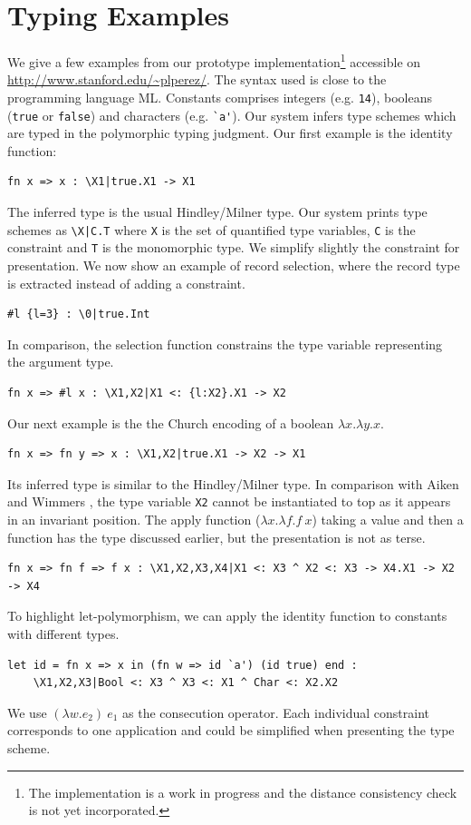 \documentclass{report}
\begin{document}
  \appendix
  \chapter{Typing Examples}
  We give a few examples from our prototype implementation\footnote{
    The implementation is a work in progress and the distance consistency check
    is not yet incorporated.}
  accessible on \url{http://www.stanford.edu/~plperez/}.
  The syntax used is close to the programming language ML. Constants comprises
  integers (e.g. \verb+14+), booleans (\verb+true+ or \verb+false+) and characters
  (e.g. \verb+`a'+). Our system infers type schemes which are typed
  in the polymorphic typing judgment.
  Our first example is the identity function:
  \begin{verbatim}fn x => x : \X1|true.X1 -> X1\end{verbatim}
  The inferred type is the usual Hindley/Milner type. Our system
  prints type schemes as \verb+\X|C.T+ where \verb+X+ is the set of quantified
  type variables, \verb+C+ is the constraint and \verb+T+ is the monomorphic
  type. We simplify slightly the constraint for presentation.
  We now show an example of record selection, where the record type
  is extracted instead of adding a constraint.
  \begin{verbatim}#l {l=3} : \0|true.Int\end{verbatim}
  In comparison, the selection function constrains the type variable
  representing the argument type.
  \begin{verbatim}fn x => #l x : \X1,X2|X1 <: {l:X2}.X1 -> X2\end{verbatim}
  Our next example is the the Church encoding of a boolean
  $\lambda x.\lambda y.x$.
  \begin{verbatim}fn x => fn y => x : \X1,X2|true.X1 -> X2 -> X1\end{verbatim}
  Its inferred type  is similar to the Hindley/Milner type.
  In comparison with Aiken and Wimmers \cite{aiken:ticti}, the type variable
  \verb+X2+ cannot be instantiated to top as it appears in an invariant position.
  The apply function ($\lambda x.\lambda f.f\ x$) taking a value and then a function
  has the type discussed earlier, but the presentation is not as terse.
  \begin{verbatim}fn x => fn f => f x : \X1,X2,X3,X4|X1 <: X3 ^ X2 <: X3 -> X4.X1 -> X2 -> X4\end{verbatim}
  To highlight let-polymorphism, we can apply the identity function to
  constants with different types.
  \begin{verbatim}let id = fn x => x in (fn w => id `a') (id true) end :
    \X1,X2,X3|Bool <: X3 ^ X3 <: X1 ^ Char <: X2.X2\end{verbatim}
  We use $(\lambda w.e_2)\ e_1$ as the consecution operator.
  Each individual constraint corresponds to one application and could
  be simplified when presenting the type scheme.
  
\end{document}
